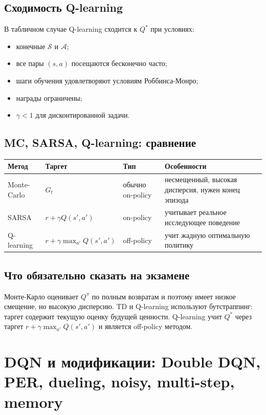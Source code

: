 \documentclass[11pt,a4paper]{article}
\newcommand{\1}{\mathbf{1}}
\newcommand{\cS}{\mathcal S}
\newcommand{\cA}{\mathcal A}
\begin{document}
\subsection*{Сходимость Q-learning}
В табличном случае Q-learning сходится к $Q^*$ при условиях:
\begin{itemize}
    \item конечные $\cS$ и $\cA$;
    \item все пары $(s,a)$ посещаются бесконечно часто;
    \item шаги обучения удовлетворяют условиям Роббинса-Монро;
    \item награды ограничены;
    \item $\gamma<1$ для дисконтированной задачи.
\end{itemize}

\subsection*{MC, SARSA, Q-learning: сравнение}
\begin{center}
\begin{tabular}{>{\raggedright\arraybackslash}p{3cm}p{3.2cm}p{3.2cm}p{3.2cm}}
\toprule
Метод & Таргет & Тип & Особенности \\
\midrule
Monte-Carlo & $G_t$ & обычно on-policy & несмещенный, высокая дисперсия, нужен конец эпизода \\
SARSA & $r+\gamma Q(s',a')$ & on-policy & учитывает реальное исследующее поведение \\
Q-learning & $r+\gamma\max_{a'}Q(s',a')$ & off-policy & учит жадную оптимальную политику \\
\bottomrule
\end{tabular}
\end{center}

\subsection*{Что обязательно сказать на экзамене}
Монте-Карло оценивает $Q^\pi$ по полным возвратам и поэтому имеет низкое смещение, но высокую дисперсию. TD и Q-learning используют бутстраппинг: таргет содержит текущую оценку будущей ценности. Q-learning учит $Q^*$ через таргет $r+\gamma\max_{a'}Q(s',a')$ и является off-policy методом.

\newpage
\section{DQN и модификации: Double DQN, PER, dueling, noisy, multi-step, memory}
\end{document}
